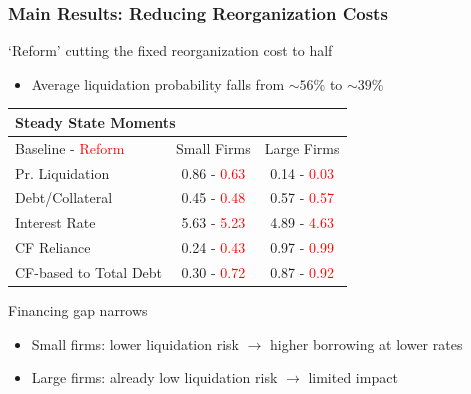 \documentclass[aspectratio=169,xcolor=table]{beamer}
\begin{document}
\begin{frame}[label = Pexp]  \frametitle{Main Results: Reducing Reorganization Costs}

`Reform' cutting the fixed reorganization cost to half
\begin{itemize} \small
    \item Average liquidation probability falls from $\sim 56\%$ to $\sim 39\%$
\end{itemize} 

\small
\begin{table}[h!]
    \centering
    \renewcommand{\arraystretch}{0.85}
    \begin{tabular}{l|c|c}
    \multicolumn{3}{l}{\textbf{Steady State Moments}} \\ 
    \toprule
     Baseline - \textcolor{red}{Reform} & Small Firms & Large Firms \\
    \midrule
    Pr. Liquidation & 0.86 - \textcolor{red}{0.63} & 0.14 - \textcolor{red}{0.03} \\ 
    Debt/Collateral & 0.45 - \textcolor{red}{0.48} & 0.57 - \textcolor{red}{0.57} \\ 
    Interest Rate & 5.63 - \textcolor{red}{5.23} & 4.89 - \textcolor{red}{4.63} \\  
    CF Reliance & 0.24 - \textcolor{red}{0.43} & 0.97 - \textcolor{red}{0.99} \\ 
    CF-based to Total Debt & 0.30 - \textcolor{red}{0.72} & 0.87 - \textcolor{red}{0.92} \\ 
    \bottomrule
    \end{tabular}
    \label{tab:SSvalues_compact}
\end{table} \normalsize

Financing gap narrows
\begin{itemize} \small
    \item Small firms: lower liquidation risk $\rightarrow$ higher borrowing at lower rates
    \item Large firms: already low liquidation risk $\rightarrow$ limited impact
\end{itemize} 

\end{frame}
\end{document}
